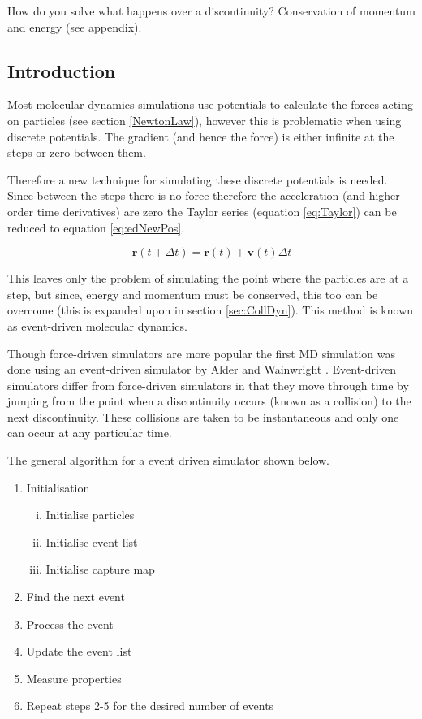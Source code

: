 \documentclass[12pt]{UoAthesis}
\begin{document}
How do you solve what happens over a discontinuity? Conservation of
momentum and energy (see appendix).

\subsection{Introduction} 

Most molecular dynamics simulations use potentials to calculate the
forces acting on particles (see section \ref{NewtonLaw}), however this
is problematic when using discrete potentials.  The gradient (and
hence the force) is either infinite at the steps or zero between them.

Therefore a new technique for simulating these discrete potentials is
needed.  Since between the steps there is no force therefore the
acceleration (and higher order time derivatives) are zero the Taylor
series (equation \eqref{eq:Taylor}) can be reduced to equation
\eqref{eq:edNewPos}.

\begin{equation}
  \mathbf{r}(t+\Delta t) = \mathbf{r}(t) + \mathbf{v}(t)\Delta t 
  \label{eq:edNewPos}
\end{equation}

This leaves only the problem of simulating the point where the
particles are at a step, but since, energy and momentum must be
conserved, this too can be overcome (this is expanded upon in section
\ref{sec:CollDyn}).  This method is known as event-driven molecular
dynamics.

Though force-driven simulators are more popular the first MD
simulation was done using an event-driven simulator by Alder and
Wainwright \cite{Alder1957}. Event-driven simulators differ from
force-driven simulators in that they move through time by jumping from
the point when a discontinuity occurs (known as a collision) to the
next discontinuity.  These collisions are taken to be instantaneous
and only one can occur at any particular time.

The general algorithm for a event driven simulator shown below.

\begin{flushleft}
  \begin{enumerate} 
  \item Initialisation 
    \begin{enumerate}[i.]
      \item Initialise particles
      \item Initialise event list
      \item Initialise capture map
    \end{enumerate}
  \item Find the next event
  \item Process the event
  \item Update the event list
  \item Measure properties 
  \item Repeat steps 2-5 for the desired number of events
  \end{enumerate} 
\end{flushleft}
\end{document}
